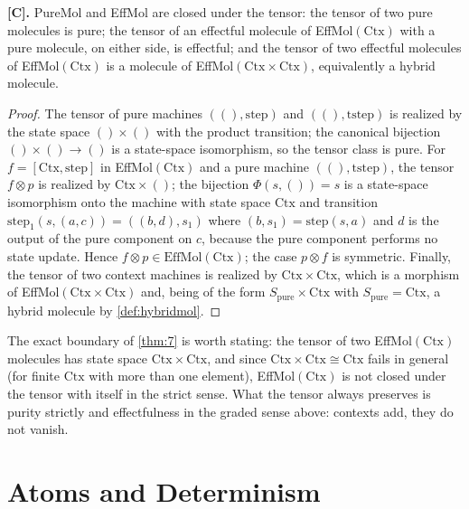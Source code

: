 \begin{theorem}\label{thm:7}
\textbf{[C].} PureMol and EffMol are closed under the tensor: the tensor of
two pure molecules is pure; the tensor of an effectful molecule of
EffMol$(\mathrm{Ctx})$ with a pure molecule, on either side, is effectful;
and the tensor of two effectful molecules of EffMol$(\mathrm{Ctx})$ is a
molecule of EffMol$(\mathrm{Ctx} \times \mathrm{Ctx})$, equivalently a hybrid
molecule.
\end{theorem}

\begin{proof}
The tensor of pure machines $((), \mathrm{step})$ and
$((), \mathrm{tstep})$ is realized by the state space $() \times ()$ with the
product transition; the canonical bijection $() \times () \to ()$ is a
state-space isomorphism, so the tensor class is pure. For
$f = [\mathrm{Ctx}, \mathrm{step}]$ in EffMol$(\mathrm{Ctx})$ and a pure
machine $((), \mathrm{tstep})$, the tensor $f \otimes p$ is realized by
$\mathrm{Ctx} \times ()$; the bijection $\Phi (s, ()) = s$ is a state-space
isomorphism onto the machine with state space $\mathrm{Ctx}$ and transition
$\mathrm{step}_1 (s, (a, c)) = ((b, d), s_1)$ where $(b, s_1) =
\mathrm{step} (s, a)$ and $d$ is the output of the pure component on $c$,
because the pure component performs no state update. Hence
$f \otimes p \in \mathrm{EffMol} (\mathrm{Ctx})$; the case $p \otimes f$ is
symmetric. Finally, the tensor of two context machines is realized by
$\mathrm{Ctx} \times \mathrm{Ctx}$, which is a morphism of
EffMol$(\mathrm{Ctx} \times \mathrm{Ctx})$ and, being of the form
$S_{\mathrm{pure}} \times \mathrm{Ctx}$ with $S_{\mathrm{pure}} =
\mathrm{Ctx}$, a hybrid molecule by \autoref{def:hybridmol}.
\end{proof}

\begin{remark}
The exact boundary of \autoref{thm:7} is worth stating: the tensor of two
EffMol$(\mathrm{Ctx})$ molecules has state space $\mathrm{Ctx} \times
\mathrm{Ctx}$, and since $\mathrm{Ctx} \times \mathrm{Ctx} \cong \mathrm{Ctx}$
fails in general (for finite $\mathrm{Ctx}$ with more than one element),
EffMol$(\mathrm{Ctx})$ is not closed under the tensor with itself in the
strict sense. What the tensor always preserves is purity strictly and
effectfulness in the graded sense above: contexts add, they do not vanish.
\end{remark}

\section{Atoms and Determinism}\label{sec:mol-atoms}

